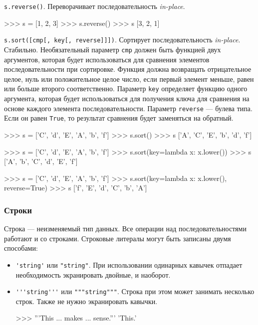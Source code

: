 \lstinline{s.reverse()}. Переворачивает последовательность \emph{in-place}.
\begin{pylst}{}{}
>>> s = [1, 2, 3]
>>> s.reverse()
>>> s
[3, 2, 1]
\end{pylst}

\lstinline{s.sort([cmp[, key[, reverse]]])}. Сортирует последовательность \emph{in-place}. Стабильно. Необязательный параметр \lstinline{cmp} должен быть функцией двух аргументов, которая будет использоваться для сравнения элементов последовательности при сортировке. Функция должна возвращать отрицательное целое, нуль или положительное целое число, если первый элемент меньше, равен или больше второго соответственно. Параметр \lstinline{key} определяет функцию одного аргумента, которая будет использоваться для получения ключа для сравнения на основе каждого элемента последовательности. Параметр \lstinline{reverse} — булева типа. Если он равен \lstinline{True}, то результат сравнения будет заменяться на обратный.
\begin{pylst}{}{}
>>> s = ['C', 'd', 'E', 'A', 'b', 'f']
>>> s.sort()
>>> s
['A', 'C', 'E', 'b', 'd', 'f']

>>> s = ['C', 'd', 'E', 'A', 'b', 'f']
>>> s.sort(key=lambda x: x.lower())
>>> s
['A', 'b', 'C', 'd', 'E', 'f']

>>> s = ['C', 'd', 'E', 'A', 'b', 'f']
>>> s.sort(key=lambda x: x.lower(), reverse=True)
>>> s
['f', 'E', 'd', 'C', 'b', 'A']
\end{pylst}

\subsubsection{Строки}
Строка — неизменяемый тип данных. Все операции над последовательностями работают и со строками. Строковые литералы могут быть записаны двумя способами:
\begin{itemize}
  \item \lstinline{'string'} или \lstinline{"string"}. При использовании одинарных кавычек отпадает необходимость экранировать двойные, и наоборот.
  \item \lstinline{'''string'''} или \lstinline{"""string"""}. Строка при этом может занимать несколько строк. Также не нужно экранировать кавычки.
\begin{pylst}{}{}
>>> '''This
... makes
... sense.'''
'This\nmakes\nsense.'
\end{pylst}
\end{itemize}

